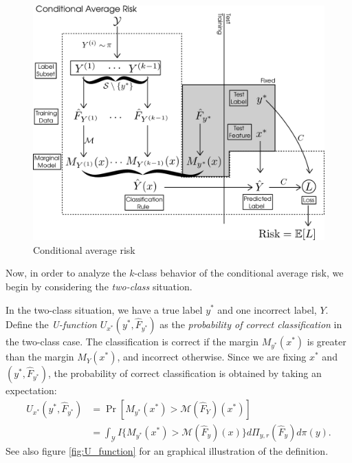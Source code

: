 \documentclass[12pt]{article}
\begin{document}
\begin{figure}[h]
\centering
\includegraphics[scale = 0.3]{extrapolation_figures/conditional_risk.png}
\caption{Conditional average risk}\label{fig:conditional_risk}
\end{figure}

Now, in order to analyze the $k$-class behavior of the conditional
average risk, we begin by considering the \emph{two-class} situation.

In the two-class situation, we have a true label $y^*$ and one
incorrect label, $Y$.  Define the \emph{U-function}
$U_{x^*}(y^*, \hat{F}_{y^*})$ as the \emph{probability of correct
classification} in the two-class case.
The classification is correct if the margin
$M_{y^*}(x^*)$ is greater than the margin $M_Y(x^*)$, and incorrect
otherwise.  
Since we are fixing $x^*$ and $(y^*, \hat{F}_{y^*})$, the
probability of correct classification is obtained by taking an expectation:
\begin{align}\label{eq:U_function}
U_{x^*}(y^*, \hat{F}_{y^*}) &= \Pr[M_{y^*}(x^*) > \mathcal{M}(\hat{F}_Y)(x^*)]
\\&= \int_{\mathcal{Y}} 
I\{
M_{y^*}(x^*) > \mathcal{M}(\hat{F}_{y})(x)
\}
d\Pi_{y, r}(\hat{F}_y)
d\pi(y).
\end{align}
See also figure \ref{fig:U_function} for an graphical illustration of
the definition.
\end{document}
